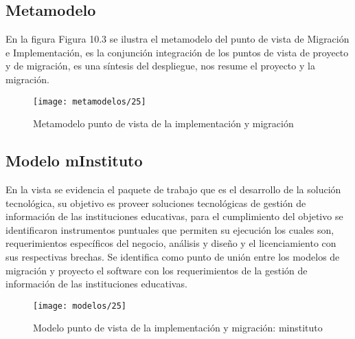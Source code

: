   \subsection{Metamodelo}
  En la figura Figura 10.3 se ilustra el metamodelo del punto de vista de Migración e Implementación, es la conjunción integración de los puntos de vista de proyecto y de migración, es una síntesis del despliegue, nos resume el proyecto y la migración.

  \begin{figure}[H]
	\centering
	\texttt{[image: metamodelos/25]}
	\captionsetup{width=.95\textwidth}
	\caption{Metamodelo punto de vista de la implementación y migración}
	\label{metamodelo25}
  \end{figure}

  \subsection{Modelo mInstituto}
  En la vista se evidencia el paquete de trabajo que es el desarrollo de la solución tecnológica, su objetivo es proveer soluciones tecnológicas de gestión de información de las instituciones educativas, para el cumplimiento del objetivo se identificaron instrumentos puntuales que permiten su ejecución los cuales son, requerimientos específicos del negocio, análisis y diseño y el licenciamiento con sus respectivas brechas.  Se identifica como punto de unión entre los modelos de migración y proyecto el software con los requerimientos de la gestión de información de las instituciones educativas.
  
  \begin{figure}[H]
	\centering
	\texttt{[image: modelos/25]}
	\captionsetup{width=.95\textwidth}
	\caption{Modelo punto de vista de la implementación y migración: minstituto}
	\label{modelo25}
  \end{figure}